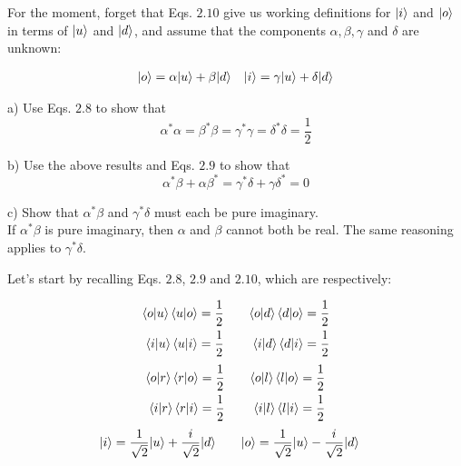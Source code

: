 \documentclass[solutions.tex]{subfiles}
\begin{document}
\maketitle
\begin{exercise}
For the moment, forget that Eqs. $2.10$ give us working
definitions for $|i\rangle$ and $|o\rangle$ in terms of $|u\rangle$
and $|d\rangle$, and assume that the components $\alpha, \beta, \gamma$
and $\delta$ are unknown:

\begin{align*}
|o\rangle &= \alpha|u\rangle + \beta|d\rangle &
|i\rangle &= \gamma|u\rangle + \delta|d\rangle \\
\end{align*}

a) Use Eqs. $2.8$ to show that
\[
	\alpha^*\alpha = \beta^*\beta = \gamma^*\gamma = \delta^*\delta = \frac1{2}
\]

b) Use the above results and Eqs. $2.9$ to show that
\[
	\alpha^*\beta + \alpha\beta^* = \gamma^*\delta + \gamma\delta^* = 0
\]

c) Show that $\alpha^*\beta$ and $\gamma^*\delta$ must each be pure imaginary. \\

If $\alpha^*\beta$ is pure imaginary, then $\alpha$ and $\beta$ cannot both be
real. The same reasoning applies to $\gamma^*\delta$.

\end{exercise}
\hrr

Let's start by recalling Eqs. $2.8$, $2.9$ and $2.10$, which are
respectively:

\begin{equation}\begin{aligned}
\left\langle o \middle| u \right\rangle\left\langle u \middle| o \right\rangle &= \frac1{2} &&&
\left\langle o \middle| d \right\rangle\left\langle d \middle| o \right\rangle &= \frac1{2} \\
\left\langle i \middle| u \right\rangle\left\langle u \middle| i \right\rangle &= \frac1{2} &&&
\left\langle i \middle| d \right\rangle\left\langle d \middle| i \right\rangle &= \frac1{2} \label{L02E03:eqn:2.8}
\end{aligned}\end{equation}
\begin{equation}\begin{aligned}
\left\langle o \middle| r \right\rangle\left\langle r \middle| o \right\rangle &= \frac1{2} &&&
\left\langle o \middle| l \right\rangle\left\langle l \middle| o \right\rangle &= \frac1{2} \\
\left\langle i \middle| r \right\rangle\left\langle r \middle| i \right\rangle &= \frac1{2} &&&
\left\langle i \middle| l \right\rangle\left\langle l \middle| i \right\rangle &= \frac1{2} \label{L02E03:eqn:2.9}
\end{aligned}\end{equation}
\begin{equation}\begin{aligned}
|i\rangle &= \frac1{\sqrt2}|u\rangle + \frac{i}{\sqrt2}|d\rangle &&&
|o\rangle &= \frac1{\sqrt2}|u\rangle - \frac{i}{\sqrt2}|d\rangle \label{L02E03:eqn:2.10}
\end{aligned}\end{equation}
\end{document}
